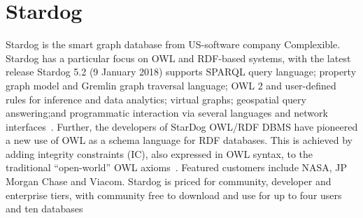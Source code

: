 \section{Stardog}
Stardog is the smart graph database from US-software company Complexible. Stardog has a particular 
focus on OWL and RDF-based systems, with the latest release Stardog 5.2 (9 January 2018) supports 
SPARQL query language; property graph model and Gremlin graph traversal language; OWL 2 and 
user-defined rules for inference and data analytics; virtual graphs; geospatial query answering;and 
programmatic interaction via several languages and network 
interfaces~\cite{hid-sp18-405-wwwdocs-stardog}. Further, the developers of StarDog OWL/RDF DBMS 
have pioneered a new use of OWL as a schema language for RDF databases. This is achieved by adding 
integrity constraints (IC), also expressed in OWL syntax, to the traditional ``open-world'' OWL 
axioms~\cite{hid-sp18-405-cer2012graphical-stardog}. Featured customers include NASA, JP Morgan 
Chase and Viacom. Stardog is priced for community, developer and enterprise tiers, with community 
free to download and use for up to four users and ten databases~\cite{hid-sp18-405-www-stardog}



